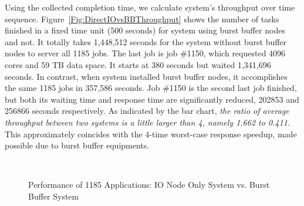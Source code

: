 Using the collected completion time, we calculate system's throughput over time sequence.
Figure~\ref{Fig:DirectIOvsBBThroughput} shows the number of tasks finished
in a fixed time unit (500 seconds) for system using burst buffer nodes and not.
It totally takes 1,448,512 seconds for the system without burst buffer nodes to
server all 1185 jobs.
The last job is job \#1150, which requested 4096 cores and 59 TB data space.
It starts at 380 seconds but waited 1,341,696 seconds.
In contrast, when system installed burst buffer nodes,
it accomplishes the same 1185 jobs in 357,586 seconds.
Job \#1150 is the second last job finished, but both its waiting time and response time
are significantly reduced, 202853 and 256866 seconds respectively.
As indicated by the bar chart,
\textit{the ratio of average throughput between two systems is a little larger than 4, namely 1.662 to 0.411.}
This approximately coincides with the 4-time worst-case response speedup,
made possible due to burst buffer equipments.

\begin{figure}[!t]
        \centering
        ~
        \caption{Performance of 1185 Applications: IO Node Only System vs. Burst Buffer System}
        \label{Fig:DirectIOPerformance}
\end{figure}


